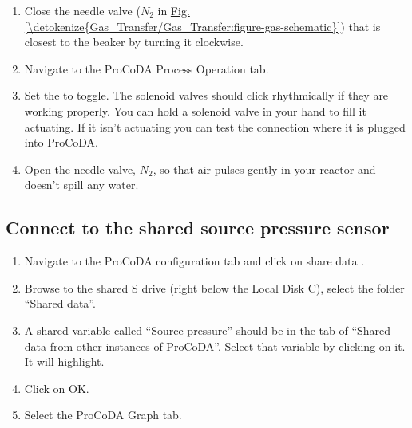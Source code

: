 \documentclass[letterpaper,10pt,english]{sphinxmanual}
\begin{document}
\begin{enumerate}
\item {} 
Close the needle valve (\(N_2\) in \hyperref[\detokenize{Gas_Transfer/Gas_Transfer:figure-gas-schematic}]{Fig.\@ \ref{\detokenize{Gas_Transfer/Gas_Transfer:figure-gas-schematic}}}) that is closest to the beaker by turning it clockwise.

\item {} 
Navigate to the ProCoDA Process Operation tab.

\item {} 
Set the  to toggle.  The solenoid valves should click rhythmically if they are working properly. You can hold a solenoid valve in your hand to fill it actuating. If it isn’t actuating you can test the connection where it is plugged into ProCoDA.

\item {} 
Open the needle valve, \(N_2\), so that air pulses gently in your reactor and doesn’t spill any water.

\end{enumerate}


\subsection{Connect to the shared source pressure sensor}
\label{\detokenize{Gas_Transfer/Gas_Transfer:connect-to-the-shared-source-pressure-sensor}}\begin{enumerate}
\item {} 
Navigate to the ProCoDA configuration tab and click on share data .

\item {} 
Browse to the shared S drive (right below the Local Disk C), select the folder “Shared data”.

\item {} 
A shared variable called “Source pressure” should be in the tab of “Shared data from other instances of ProCoDA”. Select that variable by clicking on it. It will highlight.

\item {} 
Click on OK.

\item {} 
Select the ProCoDA Graph tab.

\end{enumerate}
\end{document}
